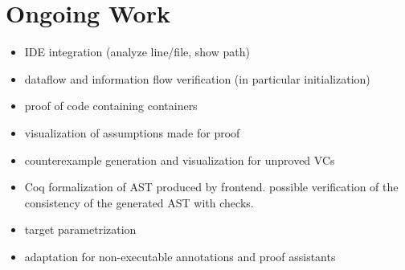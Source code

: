 \documentclass[sttt,draft]{svjour}
\begin{document}
\section{Ongoing Work}
\label{ongoing}

\begin{itemize}
\item IDE integration (analyze line/file, show path)
\item dataflow and information flow verification (in particular initialization)
\item proof of code containing containers
\item visualization of assumptions made for proof
\item counterexample generation and visualization for unproved VCs
\item Coq formalization of AST produced by frontend. possible verification of
  the consistency of the generated AST with checks.
\item target parametrization
\item adaptation for non-executable annotations and proof assistants
\end{itemize}

%


\end{document}
